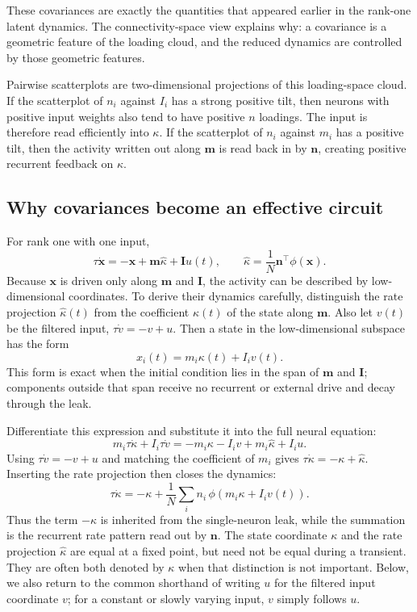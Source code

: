 \documentclass[11pt]{article}
\newcommand{\vx}{\mathbf{x}}
\newcommand{\vm}{\mathbf{m}}
\newcommand{\vn}{\mathbf{n}}
\newcommand{\vI}{\mathbf{I}}
\begin{document}
These covariances are exactly the quantities that appeared earlier in the
rank-one latent dynamics. The connectivity-space view explains why: a covariance
is a geometric feature of the loading cloud, and the reduced dynamics are
controlled by those geometric features.

Pairwise scatterplots are two-dimensional projections of this loading-space
cloud. If the scatterplot of $n_i$ against $I_i$ has a strong positive tilt, then
neurons with positive input weights also tend to have positive $n$ loadings. The
input is therefore read efficiently into $\kappa$. If the scatterplot of $n_i$
against $m_i$ has a positive tilt, then the activity written out along $\vm$ is
read back in by $\vn$, creating positive recurrent feedback on $\kappa$.

\subsection{Why covariances become an effective circuit}

For rank one with one input,
\[
  \tau \dot{\vx}
  =
  -\vx + \vm\widehat{\kappa} + \vI u(t),
  \qquad
  \widehat{\kappa} = \frac{1}{N}\vn^\top\phi(\vx).
\]
Because $\vx$ is driven only along $\vm$ and $\vI$, the activity can be described
by low-dimensional coordinates. To derive their dynamics carefully, distinguish
the rate projection $\widehat{\kappa}(t)$ from the coefficient $\kappa(t)$ of
the state along $\vm$. Also let
$v(t)$ be the filtered input, $\tau\dot v=-v+u$. Then a state in the
low-dimensional subspace has the form
\begin{equation}
  x_i(t) = m_i\kappa(t) + I_i v(t).
  \label{eq:rank_one_state_coordinates}
\end{equation}
This form is exact when the initial condition lies in the span of $\vm$ and
$\vI$; components outside that span receive no recurrent or external drive and
decay through the leak.

Differentiate this expression and substitute it into the full neural equation:
\[
  m_i\tau\dot\kappa + I_i\tau\dot v
  =
  -m_i\kappa-I_i v+m_i\widehat{\kappa}+I_i u.
\]
Using $\tau\dot v=-v+u$ and matching the coefficient of $m_i$ gives
$\tau\dot\kappa=-\kappa+\widehat{\kappa}$. Inserting the rate projection then
closes the dynamics:
\begin{equation}
  \tau \dot{\kappa}
  =
  -\kappa
  +
  \frac{1}{N}\sum_i n_i\,
  \phi\!\left(m_i\kappa + I_i v(t)\right).
  \label{eq:rank_one_mean_field_sum}
\end{equation}
Thus the term $-\kappa$ is inherited from the single-neuron leak, while the
summation is the recurrent rate pattern read out by $\vn$. The state coordinate
$\kappa$ and the rate projection $\widehat{\kappa}$ are equal at a fixed point,
but need not be equal during a transient. They are often both denoted by
$\kappa$ when that distinction is not important. Below, we also return to the
common shorthand of writing $u$ for the filtered input coordinate $v$; for a
constant or slowly varying input, $v$ simply follows $u$.
\end{document}
